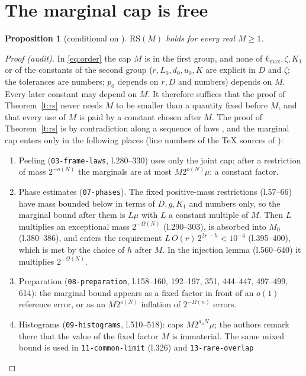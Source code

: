 \documentclass[11pt]{article}
\newtheorem{proposition}[theorem]{Proposition}
\theoremstyle{definition}\newtheorem{conjecture}[theorem]{Conjecture}
\theoremstyle{remark}\newtheorem{remark}[theorem]{Remark}
\newcommand{\RS}{\mathrm{RS}}
\begin{document}
\section{The marginal cap is free}\label{s:uniform}
\begin{proposition}[conditional on \cite{OAIH}]\label{p:uniform}
$\RS(M)$ holds for every real $M\ge1$.
\end{proposition}

\begin{proof}[Proof (audit)]
In \eqref{eq:order} the cap $M$ is in the first group, and none of $k_{\max},\zeta,K_1$ or of the constants of the second
group ($r,L_0,d_0,u_0,K$ are explicit in $D$ and $\zeta$; the tolerances are numbers; $p_0$ depends on $r,D$ and numbers)
depends on $M$. Every later constant may depend on $M$. It therefore suffices that the proof of Theorem~\ref{t:rs} never
needs $M$ to be smaller than a quantity fixed before $M$, and that every use of $M$ is paid by a constant chosen after $M$.
The proof of Theorem~\ref{t:rs} is by contradiction along a sequence of laws \cite[Section~13]{OAIH}, and the marginal cap
enters only in the following places (line numbers of the TeX sources of \cite{OAIH}):
\begin{enumerate}
\item Peeling (\texttt{03-frame-laws}, l.280--330) uses only the joint cap; after a restriction of mass $2^{-o(N)}$ the
marginals are at most $M2^{o(N)}\mu$: a constant factor.
\item Phase estimates (\texttt{07-phases}). The fixed positive-mass restrictions (l.57--66) have mass bounded below in terms
of $D,g,K_1$ and numbers only, so the marginal bound after them is $L\mu$ with $L$ a constant multiple of $M$. Then $L$
multiplies an exceptional mass $2^{-\Omega(N)}$ (l.290--303), is absorbed into $M_0$ (l.380--386), and enters the
requirement $L\,O(r)\,2^{2r-h}<10^{-4}$ (l.395--400), which is met by the choice of $h$ after $M$. In the injection lemma
(l.560--640) it multiplies $2^{-\Omega(N)}$.
\item Preparation (\texttt{08-preparation}, l.158--160, 192--197, 351, 444--447, 497--499, 614): the marginal bound appears as a
fixed factor in front of an $o(1)$ reference error, or as an $M2^{o(N)}$ inflation of $2^{-\Omega(n)}$ errors.
\item Histograms (\texttt{09-histograms}, l.510--518): caps $M2^{a_nN}\mu$; the authors remark there that the value of the
fixed factor $M$ is immaterial. The same mixed bound is used in \texttt{11-common-limit} (l.326) and \texttt{13-rare-overlap}

\end{enumerate}
\end{proof}
\end{document}
